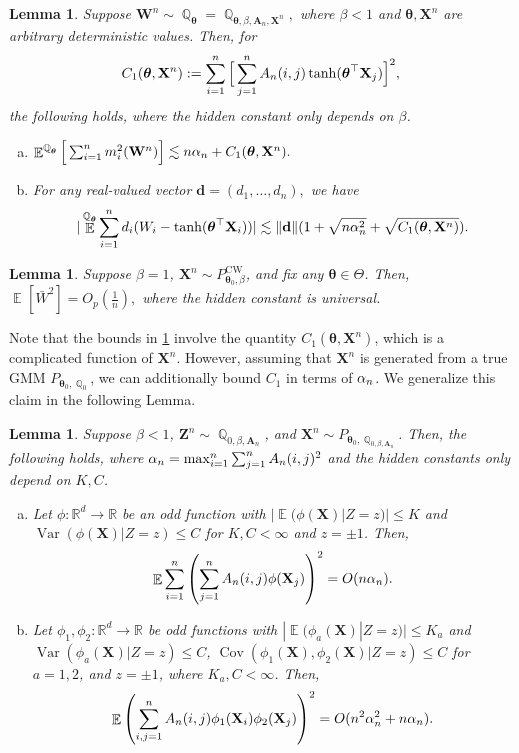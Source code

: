 \documentclass[preprint,reqno]{imsart}
\newtheorem{lemma}[thm]{Lemma}
\newcommand{\ttheta}{\boldsymbol{\theta}}
\DeclareMathOperator{\QQCW}{\QQ_{\ttheta}^{\text{CW}}}
\newcommand{\an}{\alpha_{\mathnormal n}}
\DeclareMathOperator{\EE}{\mathbb{E}}
\DeclareMathOperator{\Var}{Var}
\DeclareMathOperator{\Cov}{Cov}
\DeclareMathOperator{\QQ}{\mathbb{Q}}
\newcommand{\A}{\mathbf{A}}
\newcommand{\W}{\mathbf{W}}
\newcommand{\Z}{\mathbf{Z}}
\newcommand{\X}{\mathbf{X}}
\DeclareMathOperator{\sumin}{\sum_{\mathnormal i=1}^{\mathnormal n}}
\DeclareMathOperator{\sumjn}{\sum_{\mathnormal j=1}^{\mathnormal n}}
\DeclareMathOperator{\sumij}{\sum_{\mathnormal{ i,j}=1}^{\mathnormal n}}
\begin{document}
    
    \begin{lemma}\label{lem:RFIM moment bound}
        Suppose $\W^n \sim \QQ_{\ttheta} = \QQ_{\ttheta,\beta,\A_n,\X^n},$ where $\beta<1$ and $\ttheta, \X^n$ are arbitrary deterministic values. Then, for $$C_1(\ttheta, \X^n) : = \sumin \Big[\sumjn A_n(i,j) \tanh(\ttheta^\top \X_j) \Big]^2,$$ the following holds, where the hidden constant only depends on $\beta$.
        \begin{enumerate}[(a)]
            \item $\EE^{\QQ_{\ttheta}} \Big[\sumin m_i^2(\W^n) \Big] \lesssim n \an+ C_1(\ttheta, \X^n).$
            \item For any real-valued vector $\mathbf{d} = (d_1, \ldots, d_n),$ we have
            $$|\EE^{\QQ_{\ttheta}} \sumin d_i (W_i - \tanh(\ttheta^\top \X_i))| \lesssim \lVert \mathbf{d} \rVert (1 + \sqrt{n \alpha_n^2} + \sqrt{C_1(\ttheta, \X^n)}).$$
        \end{enumerate}
        
    \end{lemma}

    \begin{lemma}\label{lem:W bar moment bound high tmp}
        Suppose $\beta = 1$, $\X^n \sim P_{\ttheta_0, \beta}^{\text{CW}}$, and fix any $\ttheta\in \Theta$. Then, $\EE^{\QQCW} [\bar{W}^2] = O_p\left(\frac{1}{n} \right),$ where the hidden constant is universal.
    \end{lemma}

{Note that the bounds in \cref{lem:RFIM moment bound} involve the quantity $C_1(\ttheta, \X^n)$, which is a complicated function of $\X^n$. However, assuming that $\X^n$ is generated from a true GMM $P_{\ttheta_0, \QQ_{0}}$, we can additionally bound $C_1$ in terms of $\an$. We generalize this claim in the following Lemma.}
    
%
\begin{lemma}\label{lem:conditional sum}
    Suppose $\beta <1$, $\Z^n \sim \QQ_{0,\beta, \A_n}$, and $\X^n \sim P_{\ttheta_0,\QQ_{0,\beta, \A_n}}$. Then, the following holds, where $\an = \max_{i=1}^n \sumjn A_n(i,j)^2$ and the hidden constants only depend on $K, C$.
    \begin{enumerate}[(a)]
    \item Let $\phi: \mathbb{R}^d \to \mathbb{R}$ be an odd function with $|\EE(\phi(\X) | Z = z)| \le K$ and $\Var(\phi(\X) | Z = z) \le C$ for $K, C < \infty$ and $z = \pm 1$. Then,
    \begin{equation*}
        \EE \sumin \left(\sumjn A_n(i,j) \phi(\X_j) \right)^2 = O(n \an).
    \end{equation*}
    \item Let $\phi_1, \phi_2: \mathbb{R}^d \to \mathbb{R}$ be odd functions with $|\EE(\phi_a(\X) | Z = z)| \le K_a$ and $\Var(\phi_a(\X) | Z = z) \le C$, $\Cov (\phi_1(\X), \phi_2(\X) | Z = z) \le C$ for $a = 1,2$, and $z = \pm 1$, where $K_a, C < \infty$. Then,
    $$\EE \left( \sumij A_n(i,j) \phi_1(\X_i) \phi_2(\X_j) \right)^2 = O(n^2 \alpha_n^2 + n\an).$$
    \end{enumerate}
    \end{lemma}
\end{document}
